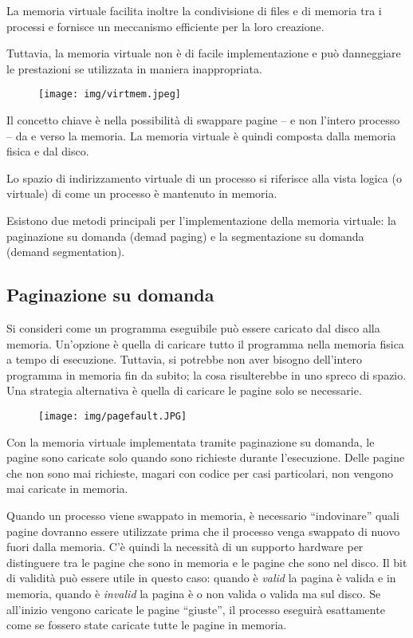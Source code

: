 \documentclass[a4paper]{article}
\begin{document}
La memoria virtuale facilita inoltre la condivisione di files e di memoria tra i processi e fornisce un meccanismo efficiente per la loro creazione.

Tuttavia, la memoria virtuale non è di facile implementazione e può danneggiare le prestazioni se utilizzata in maniera inappropriata.

\begin{figure}[h!]
    \centering    
    \texttt{[image: img/virtmem.jpeg]}
\end{figure}

Il concetto chiave è nella possibilità di swappare pagine -- e non l'intero processo -- da e verso la memoria. La memoria virtuale è quindi composta dalla memoria fisica e dal disco.

Lo spazio di indirizzamento virtuale di un processo si riferisce alla vista logica (o virtuale) di come un processo è mantenuto in memoria.

Esistono due metodi principali per l'implementazione della memoria virtuale: la paginazione su domanda (demad paging) e la segmentazione su domanda (demand segmentation).

\subsection{Paginazione su domanda}
Si consideri come un programma eseguibile può essere caricato dal disco alla memoria. Un'opzione è quella di caricare tutto il programma nella memoria fisica a tempo di esecuzione. Tuttavia, si potrebbe non aver bisogno dell'intero programma in memoria fin da subito; la cosa risulterebbe in uno spreco di spazio. Una strategia alternativa è quella di caricare le pagine solo se necessarie.

\begin{figure}[h!]
    \centering    
    \texttt{[image: img/pagefault.JPG]}
\end{figure}

Con la memoria virtuale implementata tramite paginazione su domanda, le pagine sono caricate solo quando sono richieste durante l'esecuzione. Delle pagine che non sono mai richieste, magari con codice per casi particolari, non vengono mai caricate in memoria.

Quando un processo viene swappato in memoria, è necessario ``indovinare'' quali pagine dovranno essere utilizzate prima che il processo venga swappato di nuovo fuori dalla memoria. C'è quindi la necessità di un supporto hardware per distinguere tra le pagine che sono in memoria e le pagine che sono nel disco. Il bit di validità può essere utile in questo caso: quando è \textit{valid} la pagina è valida e in memoria, quando è \textit{invalid} la pagina è o non valida o valida ma sul disco. Se all'inizio vengono caricate le pagine ``giuste'', il processo eseguirà esattamente come se fossero state caricate tutte le pagine in memoria.
\end{document}
